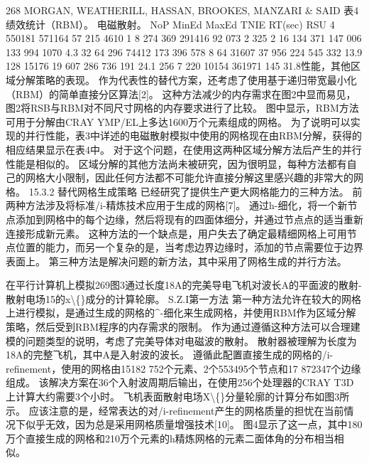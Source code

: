 \documentclass[UTF8,11pt,a4paper,openany,fontset=fandol]{ctexbook}
\begin{document}
268 MORGAN, WEATHERILL, HASSAN, BROOKES, MANZARI \& SAID 表4 绩效统计（RBM）。 电磁散射。 NoP MinEd MaxEd TNIE RT(sec) RSU 4 550181 571164 57 215 4610 1 8 274 369 291416 92 073 2 325 2 16 134 371 147 006 133 994 1070 4.3 32 64 296 74412 173 396 578 8 64 31607 37 956 224 545 332 13.9 128 15176 19 607 286 736 191 24.1 256 7 220 10154 361971 145 31.8性能，其他区域分解策略的表现。 作为代表性的替代方案，还考虑了使用基于递归带宽最小化（RBM）的简单直接分区算法[2]。 这种方法减少的内存需求在图2中显而易见，图2将RSB与RBM对不同尺寸网格的内存要求进行了比较。 图中显示，RBM方法可用于分解由CRAY YMP/EL上多达1600万个元素组成的网格。 为了说明可以实现的并行性能，表3中详述的电磁散射模拟中使用的网格现在由RBM分解，获得的相应结果显示在表4中。 对于这个问题，在使用这两种区域分解方法后产生的并行性能是相似的。 区域分解的其他方法尚未被研究，因为很明显，每种方法都有自己的网格大小限制，因此任何方法都不可能允许直接分解这里感兴趣的非常大的网格。 15.3.2 替代网格生成策略 已经研究了提供生产更大网格能力的三种方法。 前两种方法涉及将标准/i-精炼技术应用于生成的网格[7]。 通过h-细化，将一个新节点添加到网格中的每个边缘，然后将现有的四面体细分，并通过节点点的适当重新连接形成新元素。 这种方法的一个缺点是，用户失去了确定最精细网格上可用节点位置的能力，而另一个复杂的是，当考虑边界边缘时，添加的节点需要位于边界表面上。 第三种方法是解决问题的新方法，其中采用了网格生成的并行方法。

在平行计算机上模拟269图3通过长度18A的完美导电飞机对波长A的平面波的散射-散射电场15的x\textbackslash\{\}成分的计算轮廓。 S.Z.I第一方法 第一种方法允许在较大的网格上进行模拟，是通过生成的网格的\textasciicircum{}-细化来生成网格，并使用RBM作为区域分解策略，然后受到RBM程序的内存需求的限制。 作为通过遵循这种方法可以合理建模的问题类型的说明，考虑了完美导体对电磁波的散射。 散射器被理解为长度为18A的完整飞机，其中A是入射波的波长。 遵循此配置直接生成的网格的/i-refinement，使用的网格由15182 752个元素、2个553495个节点和17 872347个边缘组成。 该解决方案在36个入射波周期后输出，在使用256个处理器的CRAY T3D上计算大约需要3个小时。 飞机表面散射电场X\textbackslash\{\}分量轮廓的计算分布如图3所示。 应该注意的是，经常表达的对/i-refinement产生的网格质量的担忧在当前情况下似乎无效，因为总是采用网格质量增强技术[10]。 图4显示了这一点，其中180万个直接生成的网格和210万个元素的h精炼网格的元素二面体角的分布相当相似。
\end{document}

